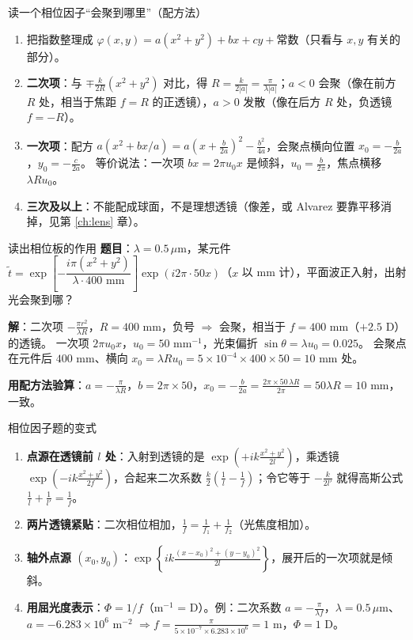 \begin{recipe}{读一个相位因子“会聚到哪里”（配方法）}
\begin{enumerate}
\item 把指数整理成 $\varphi(x,y)=a(x^2+y^2)+bx+cy+\text{常数}$（只看与 $x,y$ 有关的部分）。
\item \textbf{二次项}：与 $\mp\frac{k}{2R}(x^2+y^2)$ 对比，得 $R=\frac{k}{2|a|}=\frac{\pi}{\lambda|a|}$；$a<0$ 会聚（像在前方 $R$ 处，相当于焦距 $f=R$ 的正透镜），$a>0$ 发散（像在后方 $R$ 处，负透镜 $f=-R$）。
\item \textbf{一次项}：配方 $a(x^2+bx/a)=a\left(x+\frac{b}{2a}\right)^2-\frac{b^2}{4a}$，会聚点横向位置 $x_0=-\frac{b}{2a}$，$y_0=-\frac{c}{2a}$。
等价说法：一次项 $bx=2\pi u_0x$ 是倾斜，$u_0=\frac{b}{2\pi}$，焦点横移 $\lambda Ru_0$。
\item \textbf{三次及以上}：不能配成球面，不是理想透镜（像差，或 Alvarez 要靠平移消掉，见第 \ref{ch:lens} 章）。
\end{enumerate}
\end{recipe}

\begin{exam}{读出相位板的作用}
\textbf{题目}：$\lambda=0.5\,\mu$m，某元件 $\tilde t=\exp\left[-\dfrac{i\pi(x^2+y^2)}{\lambda\cdot400\text{ mm}}\right]\exp(i2\pi\cdot50x)$（$x$ 以 mm 计），平面波正入射，出射光会聚到哪？

\textbf{解}：二次项 $-\frac{\pi r^2}{\lambda R}$，$R=400$ mm，负号 $\Rightarrow$ 会聚，相当于 $f=400$ mm（$+2.5$ D）的透镜。
一次项 $2\pi u_0x$，$u_0=50$ mm$^{-1}$，光束偏折 $\sin\theta=\lambda u_0=0.025$。
会聚点在元件后 $400$ mm、横向 $x_0=\lambda Ru_0=5\times10^{-4}\times400\times50=10$ mm 处。

\textbf{用配方法验算}：$a=-\frac{\pi}{\lambda R}$，$b=2\pi\times50$，$x_0=-\frac{b}{2a}=\frac{2\pi\times50\,\lambda R}{2\pi}=50\lambda R=10$ mm，一致。
\end{exam}

\begin{recipe}{相位因子题的变式}
\begin{enumerate}
\item \textbf{点源在透镜前 $l$ 处}：入射到透镜的是 $\exp\left(+ik\frac{x^2+y^2}{2l}\right)$，乘透镜 $\exp\left(-ik\frac{x^2+y^2}{2f}\right)$，合起来二次系数 $\frac k2\left(\frac1l-\frac1f\right)$；令它等于 $-\frac{k}{2l'}$ 就得高斯公式 $\frac1l+\frac1{l'}=\frac1f$。
\item \textbf{两片透镜紧贴}：二次相位相加，$\frac1f=\frac1{f_1}+\frac1{f_2}$（光焦度相加）。
\item \textbf{轴外点源 $(x_0,y_0)$}：$\exp\left\{ik\frac{(x-x_0)^2+(y-y_0)^2}{2l}\right\}$，展开后的一次项就是倾斜。
\item \textbf{用屈光度表示}：$\Phi=1/f$（m$^{-1}$ = D）。例：二次系数 $a=-\frac{\pi}{\lambda f}$，$\lambda=0.5\,\mu$m、$a=-6.283\times10^{6}$ m$^{-2}$ $\Rightarrow f=\frac{\pi}{5\times10^{-7}\times6.283\times10^{6}}=1$ m，$\Phi=1$ D。
\end{enumerate}
\end{recipe}

